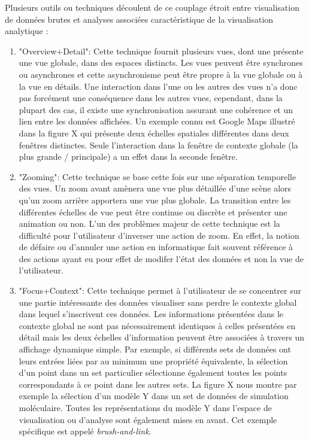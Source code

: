 Plusieurs outils ou techniques découlent de ce couplage étroit entre visualisation de données brutes et analyses associées caractéristique de la visualisation analytique \cite{cockburn2008review}:

\begin{enumerate}
    \item "Overview+Detail": Cette technique fournit plusieurs vues, dont une présente une vue globale, dans des espaces distincts. Les vues peuvent être synchrones ou asynchrones et cette asynchronisme peut être propre à la vue globale ou à la vue en détails. Une interaction dans l'une ou les autres des vues n'a donc pas forcément une conséquence dans les autres vues, cependant, dans la plupart des cas, il existe une synchronisation assurant une cohérence et un lien entre les données affichées. Un exemple connu est Google Maps illustré dans la figure X qui présente deux échelles spatiales différentes dans deux fenêtres distinctes. Seule l'interaction dans la fenêtre de contexte globale (la plus grande / principale) a un effet dans la seconde fenêtre.
    \item "Zooming": Cette technique se base cette fois sur une séparation temporelle des vues. Un zoom avant amènera une vue plus détaillée d'une scène alors qu'un zoom arrière apportera une vue plus globale. La transition entre les différentes échelles de vue peut être continue ou discrète et présenter une animation ou non. L'un des problèmes majeur de cette technique est la difficulté pour l'utilisateur d'inverser une action de zoom. En effet, la notion de défaire ou d'annuler une action en informatique fait souvent référence à des actions ayant eu pour effet de modifer l'état des données et non la vue de l'utilisateur.
    \item "Focus+Context": Cette technique permet à l'utilisateur de se concentrer sur une partie intéressante des données visualiser sans perdre le contexte global dans lequel s'inscrivent ces données. Les informations présentées dans le contexte global ne sont pas nécessairement identiques à celles présentées en détail mais les deux échelles d'information peuvent être associées à travers un affichage dynamique simple. Par exemple, si différents sets de données ont leurs entrées liées par au minimum une propriété équivalente, la sélection d'un point dans un set particulier sélectionne également toutes les points correspondants à ce point dans les autres sets. La figure X nous montre par exemple la sélection d'un modèle Y dans un set de données de simulation moléculaire. Toutes les représentations du modèle Y dans l'espace de visualisation ou d'analyse sont également mises en avant. Cet exemple spécifique est appelé \textit{brush-and-link}.

\end{enumerate}
